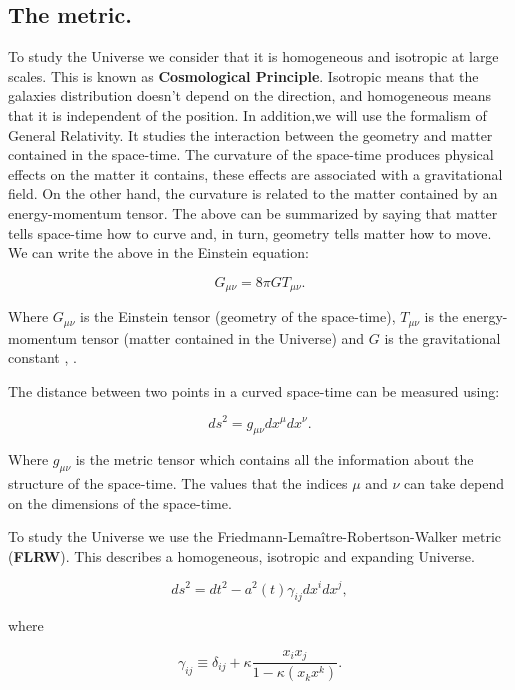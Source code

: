 \documentclass[onecolumn,           %
               showpacs,            %
               preprintnumbers,     %
               aps,                 %
               prl,          	    %
               letterpaper,             %
               superscriptaddress,      %
               nofootinbib,         %
               tightenlines,        %
               floats,floatfix      %
               ,usenatbib,
               ]{revtex4-1}
\begin{document}
\subsection{The metric.}
To study the Universe we consider that it is homogeneous and isotropic at large scales. This is known as \textbf{Cosmological Principle}. Isotropic means that the galaxies distribution doesn't depend on the direction, and homogeneous means that it is independent of the position. In addition,we will use the formalism of General Relativity. It studies the interaction between the geometry and matter contained in the space-time. The curvature of the space-time produces physical effects on the matter it contains, these effects are associated with a gravitational field. On the other hand, the curvature is related to the matter contained by an energy-momentum tensor. The above can be summarized by saying that matter tells space-time how to curve and, in turn, geometry tells matter how to move. We can write the above in the Einstein equation:

\begin{equation}
\label{einstein}
G_{\mu \nu} = 8\pi G T_{\mu \nu}.
\end{equation}

Where $G_{\mu \nu}$ is the Einstein tensor (geometry of the space-time), $T_{\mu \nu}$ is the energy-momentum tensor (matter contained in the Universe) and $G$ is the gravitational constant \cite{baumann}, \cite{wald}.

The distance between two points in a curved space-time can be measured using:

\begin{equation}
ds^2 = g_{\mu \nu}dx^{\mu}dx^{\nu}.
\end{equation}

Where $g_{\mu \nu}$ is the metric tensor which contains all the information about the structure of the space-time. The values that the indices $\mu$ and $\nu$ can take depend on the dimensions of the space-time.

To study the Universe we use the Friedmann-Lema\^itre-Robertson-Walker metric (\textbf{FLRW}). This describes a homogeneous, isotropic and expanding Universe.

\begin{equation}
\label{m2}
ds^2 = dt^2 -a^2(t)\gamma_{ij}dx^idx^j ,
\end{equation}

where

\begin{equation}
\label{m3}
\gamma_{ij} \equiv \delta_{ij} + \kappa \frac{x_i x_j}{1 - \kappa \left(x_k x^k\right)}.
\end{equation}
\end{document}
